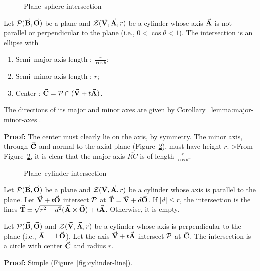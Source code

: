 \begin{figure}
\vspace{3.5cm}
\caption{Plane--sphere intersection}
\label{fig:sphere}
\end{figure}


\begin{theorem}
\label{theorem:cylinder}
Let ${\cal P}(\vec{\bf B},\vec{\bf O})$ be a plane and 
${\cal Z}(\vec{\bf V},\vec{\bf A},r)$ be a cylinder whose axis $\vec{\bf A}$ is
not parallel or perpendicular to the plane (i.e., $0 < \cos \theta < 1$).
The intersection is an ellipse with
\begin{enumerate}
     \item Semi--major axis length    : $\frac{r}{\cos\theta}$;
     \item Semi--minor axis length    : $r$;
     \item Center                     : 
               $\vec{\bf C} = {\cal P}\cap (\vec{\bf V}+t\vec{\bf A})$.
\end{enumerate}
The directions of its major and minor axes are given by 
Corollary~\ref{lemma:major-minor-axes}.
\end{theorem}
{\bf Proof:} The center must clearly lie on the axis, by symmetry.
The minor axis, through $\vec{\bf C}$ and normal to the axial plane 
(Figure~\ref{fig:cylinder}), must have height $r$.
>From Figure~\ref{fig:cylinder}, it is clear that the major axis $\overline{RC}$
is of length $\frac{r}{\cos\theta}$.
\QED

\begin{figure}
\vspace{5cm}
\caption{Plane--cylinder intersection}
\label{fig:cylinder}
\end{figure}

\begin{lemma}
     Let ${\cal P}(\vec{\bf B},\vec{\bf O})$ be a plane 
and ${\cal Z}(\vec{\bf V},\vec{\bf A},r)$ be a cylinder whose axis is parallel
to the plane.
Let $\vec{\bf V}+t\vec{\bf O}$ intersect ${\cal P}$ at 
$\vec{\bf T}=\vec{\bf V}+d\vec{\bf O}$.
If $|d| \leq r$, the intersection is the lines
$\vec{\bf T} \pm \sqrt{r^2-d^2}(\vec{\bf A}\times\vec{\bf O})+t\vec{\bf A}$.
Otherwise, it is empty.

Let ${\cal P}(\vec{\bf B},\vec{\bf O})$ and ${\cal Z}(\vec{\bf V},\vec{\bf A},r)$
be a cylinder whose axis is perpendicular to the plane (i.e., 
$\vec{\bf A} = \pm\vec{\bf O}$).  Let the axis $\vec{\bf V}+t\vec{\bf A}$ intersect
${\cal P}$ at $\vec{\bf C}$.  The intersection is a circle with center 
$\vec{\bf C}$ and radius $r$.
\end{lemma}
{\bf Proof:} Simple (Figure~\ref{fig:cylinder-line}). \QED

